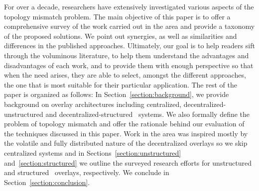 For over a decade, researchers have extensively investigated  
various aspects of the topology mismatch problem.
The main objective of this paper is to offer a comprehensive 
survey of the work carried out in the area
and provide a
taxonomy of the proposed solutions. We point out synergies, as well as
similarities and differences in the published approaches. 
Ultimately, our goal is to help readers sift through 
the voluminous literature, to help them
understand the advantages and disadvantages of each work, and 
to provide them with enough perspective so that 
when the need arises, they are able to
select, amongst the different approaches, the one that is most suitable for
their particular application.
The rest of the paper is organized as follows: 
In Section~\ref{section:background}, we provide background on
overlay architectures including centralized, decentralized-unstructured and
decentralized-structured \p\ systems.
We also formally define the problem of topology mismatch 
and offer the rationale behind our 
evaluation of the techniques discussed in this paper. 
Work in the area was inspired mostly by the volatile and fully
distributed nature of the decentralized overlays so we skip
centralized systems and in Sections~\ref{section:unstructured} and~\ref{section:structured}
we outline the surveyed research efforts
for unstructured and structured \p\ overlays, respectively.
We conclude in Section~\ref{section:conclusion}.
